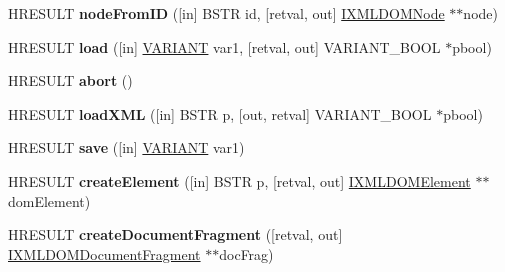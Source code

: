 \begin{DoxyCompactItemize}
\mbox{\label{interface_m_s_x_m_l2_1_1_i_x_m_l_d_o_m_document_a751eab69e4b02f93e43f2bf797f15907}} 
H\+R\+E\+S\+U\+LT {\bfseries node\+From\+ID} (\mbox{[}in\mbox{]} B\+S\+TR id, \mbox{[}retval, out\mbox{]} \hyperlink{interface_m_s_x_m_l2_1_1_i_x_m_l_d_o_m_node}{I\+X\+M\+L\+D\+O\+M\+Node} $\ast$$\ast$node)
\item 
\mbox{\label{interface_m_s_x_m_l2_1_1_i_x_m_l_d_o_m_document_a44497bf88817e937ee1b0f14e62cec7a}} 
H\+R\+E\+S\+U\+LT {\bfseries load} (\mbox{[}in\mbox{]} \hyperlink{structtag_v_a_r_i_a_n_t}{V\+A\+R\+I\+A\+NT} var1, \mbox{[}retval, out\mbox{]} V\+A\+R\+I\+A\+N\+T\+\_\+\+B\+O\+OL $\ast$pbool)
\item 
\mbox{\label{interface_m_s_x_m_l2_1_1_i_x_m_l_d_o_m_document_a871c05778f6945b586d0aa25a103c2b5}} 
H\+R\+E\+S\+U\+LT {\bfseries abort} ()
\item 
\mbox{\label{interface_m_s_x_m_l2_1_1_i_x_m_l_d_o_m_document_aad034fc5a082971ba3453182f508fd54}} 
H\+R\+E\+S\+U\+LT {\bfseries load\+X\+ML} (\mbox{[}in\mbox{]} B\+S\+TR p, \mbox{[}out, retval\mbox{]} V\+A\+R\+I\+A\+N\+T\+\_\+\+B\+O\+OL $\ast$pbool)
\item 
\mbox{\label{interface_m_s_x_m_l2_1_1_i_x_m_l_d_o_m_document_ab04b05bb7a06019c1ffd3f05be74ab3b}} 
H\+R\+E\+S\+U\+LT {\bfseries save} (\mbox{[}in\mbox{]} \hyperlink{structtag_v_a_r_i_a_n_t}{V\+A\+R\+I\+A\+NT} var1)
\item 
\mbox{\label{interface_m_s_x_m_l2_1_1_i_x_m_l_d_o_m_document_aa63b6edfa8b6bb4ab271d7db04da8f37}} 
H\+R\+E\+S\+U\+LT {\bfseries create\+Element} (\mbox{[}in\mbox{]} B\+S\+TR p, \mbox{[}retval, out\mbox{]} \hyperlink{interface_m_s_x_m_l2_1_1_i_x_m_l_d_o_m_element}{I\+X\+M\+L\+D\+O\+M\+Element} $\ast$$\ast$dom\+Element)
\item 
\mbox{\label{interface_m_s_x_m_l2_1_1_i_x_m_l_d_o_m_document_a083c503c47aa36f6414bed9f76138272}} 
H\+R\+E\+S\+U\+LT {\bfseries create\+Document\+Fragment} (\mbox{[}retval, out\mbox{]} \hyperlink{interface_m_s_x_m_l2_1_1_i_x_m_l_d_o_m_document_fragment}{I\+X\+M\+L\+D\+O\+M\+Document\+Fragment} $\ast$$\ast$doc\+Frag)
$$
\end{DoxyCompactItemize}
